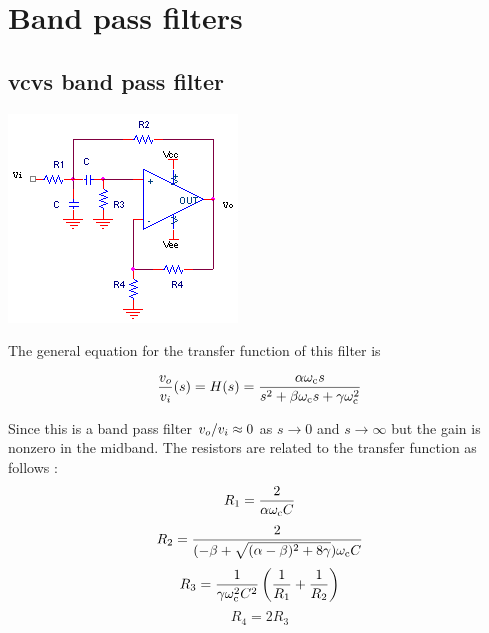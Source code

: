 \section{Band pass filters}

\subsection{\acs{vcvs} band pass filter}
\begin{center}
	\includegraphics{schematics/vcvs_bandpass.PNG}
\end{center}
The general equation for the transfer function of this filter is

\textcolor{red}{
\begin{equation}
\frac{\vout}{\vin}(s) = \Hs = \frac{\alpha \wcutoff s}{s^2+\beta \wcutoff s + \gamma \wcutoff^2}
\label{eq:vcvs_bandpass}
\end{equation}
}

Since this is a band pass filter $\vout/\vin \approx 0$ as $s \to 0$ and $s \to \infty$ but the gain is nonzero in the midband.
The resistors are related to the transfer function as follows \autocite[138-139]{op-amp-circuits-johnson}:
\begin{equation}
R_1 = \frac{2}{\alpha \omega_\mathrm{c} C}
\end{equation}
\begin{equation}
R_2 = \frac{2}{(-\beta+\sqrt{(\alpha - \beta)^2 + 8\gamma})\omega_\mathrm{c} C}
\end{equation}
\begin{equation}
R_3 = \frac{1}{\gamma \omega_\mathrm{c}^2 C^2}\left(\frac{1}{R_1} + \frac{1}{R_2}\right)
\end{equation}
\begin{equation}
R_4 = 2R_3
\end{equation}

